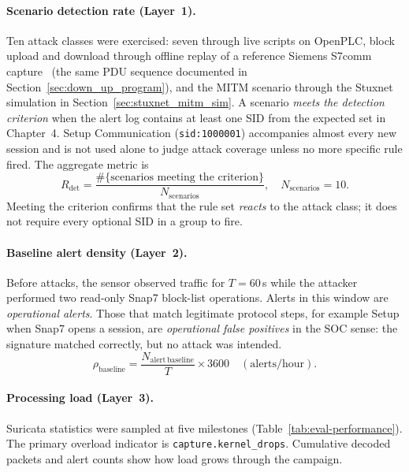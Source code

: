 \documentclass[../main.tex]{subfiles}
\begin{document}
\paragraph{Scenario detection rate (Layer~1).}
Ten attack classes were exercised: seven through live scripts on OpenPLC, block upload and download through offline replay of a reference Siemens S7comm capture~\cite{wireshark_s7comm} (the same PDU sequence documented in Section~\ref{sec:down_up_program}), and the MITM scenario through the Stuxnet simulation in Section~\ref{sec:stuxnet_mitm_sim}. A scenario \emph{meets the detection criterion} when the alert log contains at least one SID from the expected set in Chapter~4. Setup Communication (\texttt{sid:1000001}) accompanies almost every new session and is not used alone to judge attack coverage unless no more specific rule fired. The aggregate metric is
\begin{equation}
    R_{\mathrm{det}} = \frac{\#\{\text{scenarios meeting the criterion}\}}{N_{\mathrm{scenarios}}}, \quad N_{\mathrm{scenarios}} = 10.
\end{equation}
Meeting the criterion confirms that the rule set \emph{reacts} to the attack class; it does not require every optional SID in a group to fire.

\paragraph{Baseline alert density (Layer~2).}
Before attacks, the sensor observed traffic for $T = 60$\,s while the attacker performed two read-only Snap7 block-list operations. Alerts in this window are \emph{operational alerts}. Those that match legitimate protocol steps, for example Setup when Snap7 opens a session, are \emph{operational false positives} in the SOC sense: the signature matched correctly, but no attack was intended.
\begin{equation}
    \label{eq:baseline-density}
    \rho_{\mathrm{baseline}} = \frac{N_{\mathrm{alert\,baseline}}}{T} \times 3600 \quad \mathrm{(alerts/hour)}.
\end{equation}

\paragraph{Processing load (Layer~3).}
Suricata statistics were sampled at five milestones (Table~\ref{tab:eval-performance}). The primary overload indicator is \texttt{capture.kernel\_drops}. Cumulative decoded packets and alert counts show how load grows through the campaign.
\end{document}
